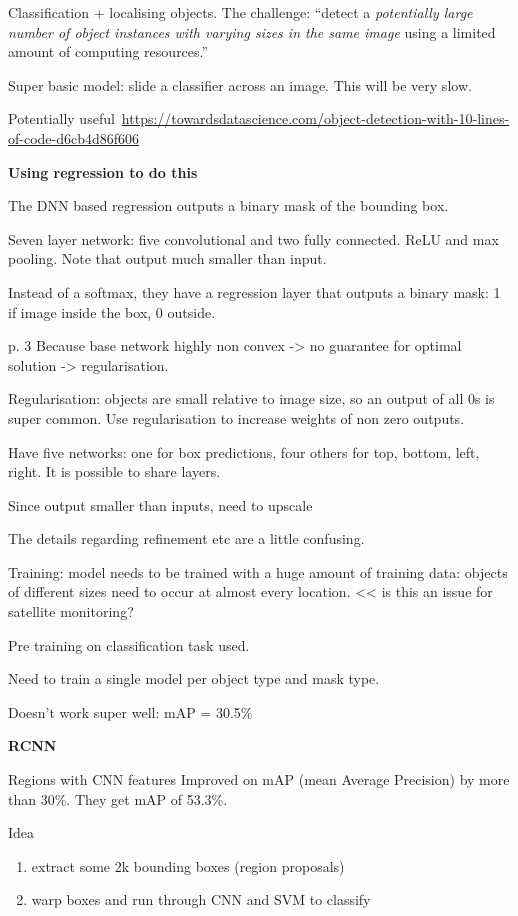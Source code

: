 \documentclass[12pt, a4paper, oneside, headinclude, footinclude]{article}
\begin{document}
Classification + localising objects. The challenge: ``detect a \textit{potentially large
number of object instances with varying sizes in the same image} using a
limited amount of computing resources.''~\cite[Their emphasis]{NIPS2013_5207}

Super basic model: slide a classifier across an image. This will be very slow.

Potentially
useful~\url{https://towardsdatascience.com/object-detection-with-10-lines-of-code-d6cb4d86f606}

\textbf{Using regression to do this}~\cite{NIPS2013_5207}

The DNN based regression outputs a binary mask of the bounding box. 

Seven layer network: five convolutional and two fully connected. ReLU and max
pooling. Note that output much smaller than input.

Instead of a softmax, they have a regression layer that outputs a binary mask:
1 if image inside the box, 0 outside.\ 

p. 3 Because base network highly non convex -> no guarantee for optimal solution ->
regularisation.

Regularisation: objects are small relative to image size, so an output of all
0s is super common. Use regularisation to increase weights of non zero
outputs.

Have five networks: one for box predictions, four others for {top, bottom,
left, right}. 
It is possible to share layers. 

Since output smaller than inputs, need to upscale

The details regarding refinement etc are a little confusing. 

Training: model needs to be trained with a huge amount of training data:
objects of different sizes need to occur at almost every location. << is this
an issue for satellite monitoring?

Pre training on classification task used.

Need to train a single model per object type and mask type.

Doesn't work super well: mAP = 30.5\%

\textbf{RCNN}~\cite{Girshick2014, Girshick2015}

Regions with CNN features
Improved on mAP (mean Average Precision) by more than 30\%. They get mAP of
53.3\%. 

Idea
\begin{enumerate}
    \item extract some 2k bounding boxes (region proposals)
    \item warp boxes and run through CNN and SVM to classify
\end{enumerate}
\end{document}
